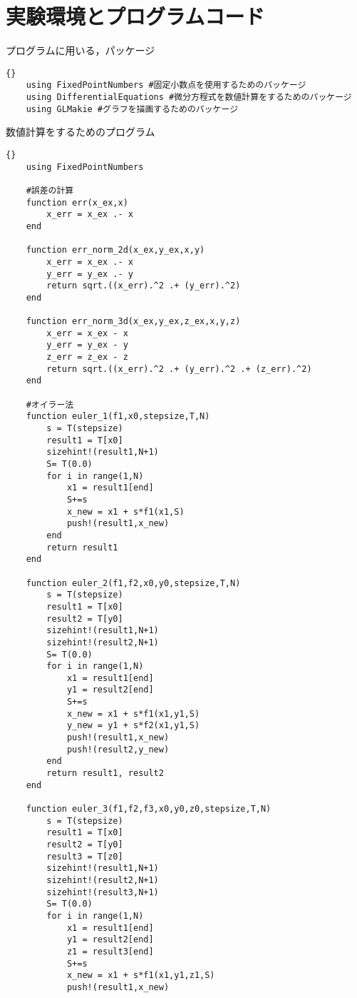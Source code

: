 \chapter{実験環境とプログラムコード}
\label{chap:実験環境とプログラムコード}
プログラムに用いる，パッケージ
\begin{lstlisting}[caption=package,label=1]{}
    using FixedPointNumbers #固定小数点を使用するためのパッケージ
    using DifferentialEquations #微分方程式を数値計算をするためのパッケージ
    using GLMakie #グラフを描画するためのパッケージ
\end{lstlisting}


数値計算をするためのプログラム
\begin{lstlisting}[caption =\text{numerical\_scheme.jl}, label = a]{}
    using FixedPointNumbers

    #誤差の計算
    function err(x_ex,x)
        x_err = x_ex .- x
    end

    function err_norm_2d(x_ex,y_ex,x,y)
        x_err = x_ex .- x
        y_err = y_ex .- y
        return sqrt.((x_err).^2 .+ (y_err).^2)
    end

    function err_norm_3d(x_ex,y_ex,z_ex,x,y,z)
        x_err = x_ex - x
        y_err = y_ex - y
        z_err = z_ex - z
        return sqrt.((x_err).^2 .+ (y_err).^2 .+ (z_err).^2)
    end

    #オイラー法
    function euler_1(f1,x0,stepsize,T,N) 
        s = T(stepsize)
        result1 = T[x0]
        sizehint!(result1,N+1)
        S= T(0.0)
        for i in range(1,N)
            x1 = result1[end]
            S+=s
            x_new = x1 + s*f1(x1,S)
            push!(result1,x_new)
        end
        return result1
    end

    function euler_2(f1,f2,x0,y0,stepsize,T,N)
        s = T(stepsize)
        result1 = T[x0]
        result2 = T[y0]
        sizehint!(result1,N+1)
        sizehint!(result2,N+1)
        S= T(0.0)
        for i in range(1,N)
            x1 = result1[end]
            y1 = result2[end]
            S+=s
            x_new = x1 + s*f1(x1,y1,S)
            y_new = y1 + s*f2(x1,y1,S)
            push!(result1,x_new)
            push!(result2,y_new)
        end
        return result1, result2
    end

    function euler_3(f1,f2,f3,x0,y0,z0,stepsize,T,N)
        s = T(stepsize)
        result1 = T[x0]
        result2 = T[y0]
        result3 = T[z0]
        sizehint!(result1,N+1)
        sizehint!(result2,N+1)
        sizehint!(result3,N+1)
        S= T(0.0)
        for i in range(1,N)
            x1 = result1[end]
            y1 = result2[end]
            z1 = result3[end]
            S+=s
            x_new = x1 + s*f1(x1,y1,z1,S)
            push!(result1,x_new)


\end{lstlisting}
